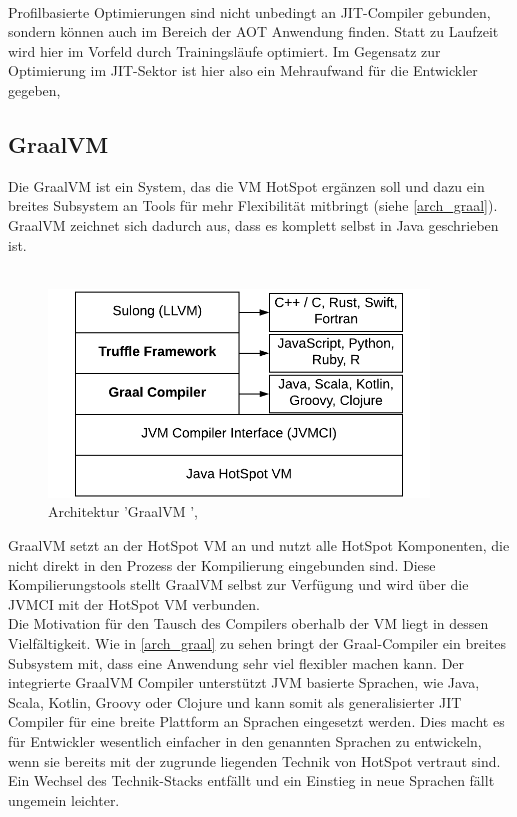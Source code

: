 \\
Profilbasierte Optimierungen sind nicht unbedingt an \ac{JIT}-Compiler gebunden, sondern können auch im Bereich der \ac{AOT} Anwendung finden. Statt zu Laufzeit wird hier im Vorfeld durch Trainingsläufe optimiert. Im Gegensatz zur Optimierung im \ac{JIT}-Sektor ist hier also ein Mehraufwand für die Entwickler gegeben, \cite[vgl. Westrelin 2021, Webseite abgerufen am 02.12.2022]{westrelin_2022}



\subsection{GraalVM }
Die GraalVM  ist ein System, das die \ac{VM} HotSpot ergänzen soll und dazu ein breites Subsystem an Tools für mehr Flexibilität mitbringt (siehe \autoref{arch_graal}). GraalVM zeichnet sich dadurch aus, dass es komplett selbst in Java geschrieben ist. \\
\\
\begin{figure}[ht]
    \begin{center}
        \includegraphics[width=0.9\textwidth]{assets/img/GraalVM-Architecture.png}
        \caption{Architektur 'GraalVM ', \cite[Quelle: Sipek 2020]{Sipek_2020}}
        \label{arch_graal}
    \end{center}
\end{figure}
GraalVM  setzt an der HotSpot \ac{VM} an und nutzt alle HotSpot Komponenten, die nicht direkt in den Prozess der Kompilierung eingebunden sind. Diese Kompilierungstools stellt GraalVM selbst zur Verfügung und wird über die \ac{JVMCI} mit der HotSpot \ac{VM} verbunden. \\
Die Motivation für den Tausch des Compilers oberhalb der \ac{VM} liegt in dessen Vielfältigkeit. Wie in \autoref{arch_graal} zu sehen bringt der Graal-Compiler ein breites Subsystem mit, dass eine Anwendung sehr viel flexibler machen kann. Der integrierte GraalVM Compiler unterstützt \ac{JVM} basierte Sprachen, wie Java, Scala, Kotlin, Groovy oder Clojure und kann somit als generalisierter \ac{JIT} Compiler für eine breite Plattform an Sprachen eingesetzt werden. Dies macht es für Entwickler wesentlich einfacher in den genannten Sprachen zu entwickeln, wenn sie bereits mit der zugrunde liegenden Technik von HotSpot vertraut sind. Ein Wechsel des Technik-Stacks entfällt und ein Einstieg in neue Sprachen fällt ungemein leichter. \\
